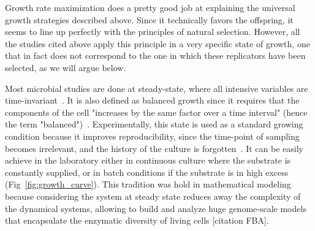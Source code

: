 Growth rate maximization does a pretty good job at explaining the universal growth strategies described above.
Since it technically favors the offspring, it seems to line up perfectly with the principles of natural selection.
However, all the studies cited above apply this principle in a very specific state of growth, one that in fact does not correspond to the one in which these replicators have been selected, as we will argue below.

Most microbial studies are done at steady-state, where all intensive variables are time-invariant~\cite{schaechter_microbe_2006,fishov_microbial_1995}.
It is also defined as balanced growth since it requires that the components of the cell "increases by the same factor over a time interval" (hence the term "balanced")~\cite{campbell_synchronization_1957}.
Experimentally, this state is used as a standard growing condition because it improves reproducibility, since the time-point of sampling becomes irrelevant, and the history of the culture is forgotten~\cite{schaechter_microbe_2006}.
It can be easily achieve in the laboratory either in continuous culture where the substrate is constantly supplied, or in batch conditions if the substrate is in high excess (Fig~\ref{fig:growth_curve}).
This tradition was hold in mathematical modeling because considering the system at steady state reduces away the complexity of the dynamical systems, allowing to build and analyze huge genome-scale models that encapsulate the enzymatic diversity of living cells [citation FBA].

